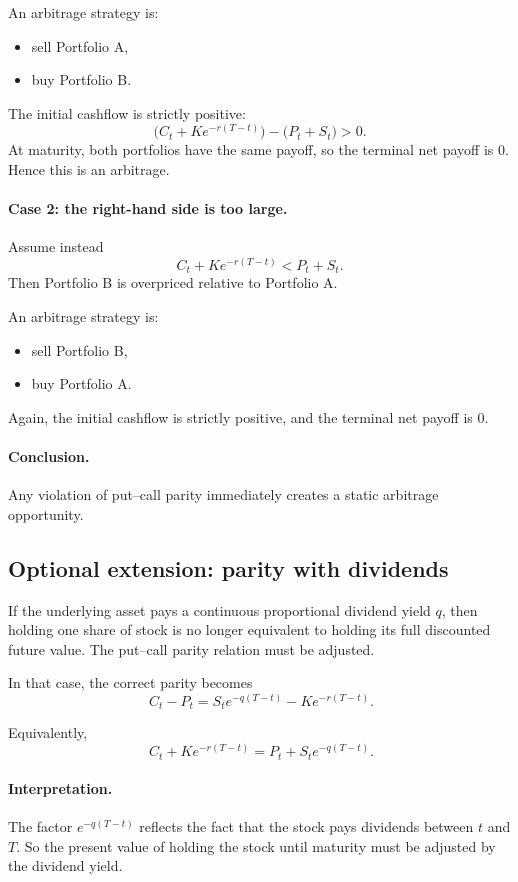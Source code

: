 \documentclass[11pt]{article}
\newcommand{\1}{\mathbf{1}}
\theoremstyle{plain}
\theoremstyle{definition}
\theoremstyle{remark}
\begin{document}
An arbitrage strategy is:
\begin{itemize}[leftmargin=1.4em]
    \item sell Portfolio A,
    \item buy Portfolio B.
\end{itemize}

The initial cashflow is strictly positive:
\[
\big(C_t + K e^{-r(T-t)}\big) - \big(P_t+S_t\big) > 0.
\]
At maturity, both portfolios have the same payoff, so the terminal net payoff is \(0\).
Hence this is an arbitrage.

\paragraph{Case 2: the right-hand side is too large.}
Assume instead
\[
C_t + K e^{-r(T-t)} < P_t + S_t.
\]
Then Portfolio B is overpriced relative to Portfolio A.

An arbitrage strategy is:
\begin{itemize}[leftmargin=1.4em]
    \item sell Portfolio B,
    \item buy Portfolio A.
\end{itemize}

Again, the initial cashflow is strictly positive, and the terminal net payoff is \(0\).

\paragraph{Conclusion.}
Any violation of put--call parity immediately creates a static arbitrage opportunity.

\subsection{Optional extension: parity with dividends}

If the underlying asset pays a continuous proportional dividend yield \(q\),
then holding one share of stock is no longer equivalent to holding its full discounted future value.
The put--call parity relation must be adjusted.

In that case, the correct parity becomes
\[
\boxed{
\ C_t-P_t = S_t e^{-q(T-t)} - K e^{-r(T-t)}.
}
\]

Equivalently,
\[
\boxed{
\ C_t + K e^{-r(T-t)} = P_t + S_t e^{-q(T-t)}.
}
\]

\paragraph{Interpretation.}
The factor \(e^{-q(T-t)}\) reflects the fact that the stock pays dividends between \(t\) and \(T\).
So the present value of holding the stock until maturity must be adjusted by the dividend yield.
\end{document}
